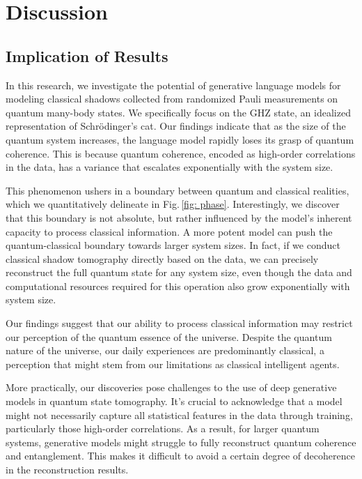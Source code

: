 \documentclass[fleqn,11pt]{wlscirep}
\newcommand{\figref}[1]{Fig.\,\ref{#1}}
\begin{document}
\section*{Discussion}

\subsection*{Implication of Results}

In this research, we investigate the potential of generative language models for modeling classical shadows collected from randomized Pauli measurements on quantum many-body states. We specifically focus on the GHZ state, an idealized representation of Schrödinger's cat. Our findings indicate that as the size of the quantum system increases, the language model rapidly loses its grasp of quantum coherence. This is because quantum coherence, encoded as high-order correlations in the data, has a variance that escalates exponentially with the system size.

This phenomenon ushers in a boundary between quantum and classical realities, which we quantitatively delineate in \figref{fig: phase}. Interestingly, we discover that this boundary is not absolute, but rather influenced by the model's inherent capacity to process classical information. A more potent model can push the quantum-classical boundary towards larger system sizes. In fact, if we conduct classical shadow tomography directly based on the data, we can precisely reconstruct the full quantum state for any system size, even though the data and computational resources required for this operation also grow exponentially with system size.

Our findings suggest that our ability to process classical information may restrict our perception of the quantum essence of the universe. Despite the quantum nature of the universe, our daily experiences are predominantly classical, a perception that might stem from our limitations as classical intelligent agents.

More practically, our discoveries pose challenges to the use of deep generative models in quantum state tomography. \cite{Torlai2017N1703.05334, Torlai2018L1801.09684, Xu2018N1811.06654, Torlai2019I1904.08441, Neugebauer2020N2007.16185, Ahmed2021Q2008.03240, Koutny2022N2206.06736, Quek2018A1812.06693, Iouchtchenko2023N2206.15449, Carrasquilla2018R1810.10584, Carrasquilla2021P1912.11052, Cha2022A2006.12469} It's crucial to acknowledge that a model might not necessarily capture all statistical features in the data through training, particularly those high-order correlations. \cite{Goldt2020T2006.14709, Ingrosso2022D2202.00565, Refinetti2022N2211.11567} As a result, for larger quantum systems, generative models might struggle to fully reconstruct quantum coherence and entanglement. This makes it difficult to avoid a certain degree of decoherence in the reconstruction results.
\end{document}
